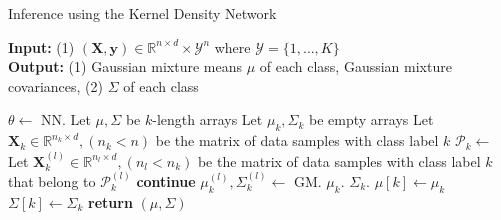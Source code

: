 \documentclass{article}
\begin{document}
\begin{algorithm}
\caption{Inference using the Kernel Density Network}\label{alg:cap}
\hspace*{\algorithmicindent} \textbf{Input:} (1) $(\mathbf{X}, \mathbf{y})  \in \mathbb{R}^{n \times d} \times \mathcal{Y}^n$ where $\mathcal{Y} = \{1, \dots, K \}$ \\
\hspace*{\algorithmicindent} \textbf{Output:} (1) Gaussian mixture means $\mu$ of each class, Gaussian mixture covariances, (2) $\Sigma$ of each class
\begin{algorithmic}[1]
    \State $\theta \gets$ NN. 
    \State Let $\mu, \Sigma$ be $k$-length arrays
        \State Let $\mu_k, \Sigma_k$ be empty arrays
        \State Let $\mathbf{X}_k \in \mathbb{R}^{n_k \times d}, (n_k < n)$ be the matrix of data samples with class label $k$
        \State $\mathcal{P}_k \gets$  
            \State Let $\mathbf{X}_k^{(l)} \in \mathbb{R}^{n_l \times d}, (n_l < n_k)$ be the matrix of data samples with class label $k$ that belong to $\mathcal{P}_k^{(l)}$
                \State \textbf{continue}
            \EndIf
            \State $\mu_k^{(l)}, \Sigma_k^{(l)} \gets $ GM. 
            \State $\mu_k$.
            \State $\Sigma_k$.
        \EndFor
        \State $\mu[k] \gets \mu_k$
        \State $\Sigma[k] \gets \Sigma_k$
    \EndFor
    \State \textbf{return} $(\mu, \Sigma)$
\EndFunction
\end{algorithmic}
\end{algorithm}
\end{document}
